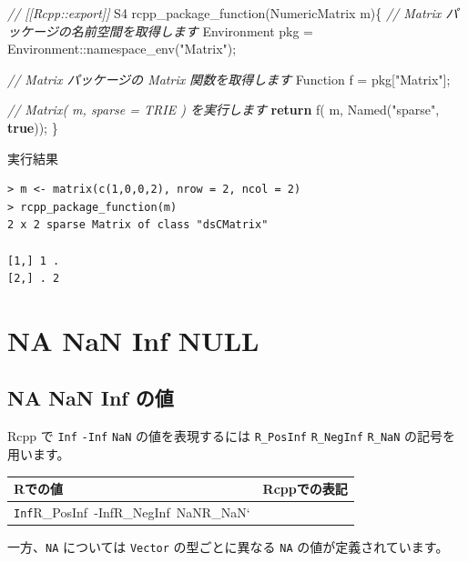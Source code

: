 \documentclass[]{book}
\newenvironment{Shaded}{\begin{snugshade}}{\end{snugshade}}
\newcommand{\CommentTok}[1]{\textcolor[rgb]{0.56,0.35,0.01}{\textit{#1}}}
\newcommand{\ControlFlowTok}[1]{\textcolor[rgb]{0.13,0.29,0.53}{\textbf{#1}}}
\newcommand{\KeywordTok}[1]{\textcolor[rgb]{0.13,0.29,0.53}{\textbf{#1}}}
\newcommand{\NormalTok}[1]{#1}
\newcommand{\StringTok}[1]{\textcolor[rgb]{0.31,0.60,0.02}{#1}}
\begin{document}
\begin{Shaded}
\begin{Highlighting}[]
\CommentTok{// [[Rcpp::export]]}
\NormalTok{S4 rcpp_package_function(NumericMatrix m)\{}
    \CommentTok{// Matrix パッケージの名前空間を取得します}
\NormalTok{    Environment pkg = Environment::namespace_env(}\StringTok{"Matrix"}\NormalTok{);}
    
    \CommentTok{// Matrix パッケージの Matrix 関数を取得します}
\NormalTok{    Function f = pkg[}\StringTok{"Matrix"}\NormalTok{];}
    
    \CommentTok{// Matrix( m, sparse = TRIE ) を実行します}
    \ControlFlowTok{return}\NormalTok{ f( m, Named(}\StringTok{"sparse"}\NormalTok{, }\KeywordTok{true}\NormalTok{));}
\NormalTok{\}}
\end{Highlighting}
\end{Shaded}

実行結果

\begin{verbatim}
> m <- matrix(c(1,0,0,2), nrow = 2, ncol = 2)
> rcpp_package_function(m)
2 x 2 sparse Matrix of class "dsCMatrix"
        
[1,] 1 .
[2,] . 2
\end{verbatim}

\hypertarget{na-nan-inf-null}{%
\chapter{NA NaN Inf NULL}\label{na-nan-inf-null}}

\hypertarget{na-nan-inf-}{%
\section{NA NaN Inf の値}\label{na-nan-inf-}}

Rcpp で \texttt{Inf} \texttt{-Inf} \texttt{NaN} の値を表現するには \texttt{R\_PosInf} \texttt{R\_NegInf} \texttt{R\_NaN} の記号を用います。

\begin{longtable}[]{@{}ll@{}}
\toprule
Rでの値 & Rcppでの表記\tabularnewline
\midrule
\endhead
\texttt{Inf\textbar{}}R\_PosInf\texttt{\textbar{}\ \textbar{}}-Inf\texttt{\textbar{}}R\_NegInf\texttt{\textbar{}\ \textbar{}}NaN\texttt{\textbar{}}R\_NaN` &\tabularnewline
\bottomrule
\end{longtable}

一方、\texttt{NA} については \texttt{Vector} の型ごとに異なる \texttt{NA} の値が定義されています。
\end{document}
